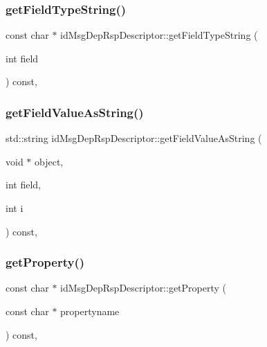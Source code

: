 \subsubsection{\texorpdfstring{get\+Field\+Type\+String()}{getFieldTypeString()}}
{\footnotesize\ttfamily const char $\ast$ id\+Msg\+Dep\+Rsp\+Descriptor\+::get\+Field\+Type\+String (\begin{DoxyParamCaption}\item[{int}]{field }\end{DoxyParamCaption}) const\hspace{0.3cm}{\ttfamily [override]}, {\ttfamily [virtual]}}

\mbox{\label{classidMsgDepRspDescriptor_af28908b0998ae5028ce4439705a56bea}} 
\subsubsection{\texorpdfstring{get\+Field\+Value\+As\+String()}{getFieldValueAsString()}}
{\footnotesize\ttfamily std\+::string id\+Msg\+Dep\+Rsp\+Descriptor\+::get\+Field\+Value\+As\+String (\begin{DoxyParamCaption}\item[{void $\ast$}]{object,  }\item[{int}]{field,  }\item[{int}]{i }\end{DoxyParamCaption}) const\hspace{0.3cm}{\ttfamily [override]}, {\ttfamily [virtual]}}

\mbox{\label{classidMsgDepRspDescriptor_a241bcfafb380d863d82e281b53c569d5}} 
\subsubsection{\texorpdfstring{get\+Property()}{getProperty()}}
{\footnotesize\ttfamily const char $\ast$ id\+Msg\+Dep\+Rsp\+Descriptor\+::get\+Property (\begin{DoxyParamCaption}\item[{const char $\ast$}]{propertyname }\end{DoxyParamCaption}) const\hspace{0.3cm}{\ttfamily [override]}, {\ttfamily [virtual]}}


